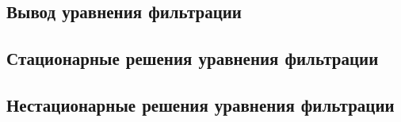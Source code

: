 \subsection{Вывод уравнения фильтрации}



\subsection{Стационарные решения уравнения фильтрации}



\subsection{Нестационарные решения уравнения фильтрации}

